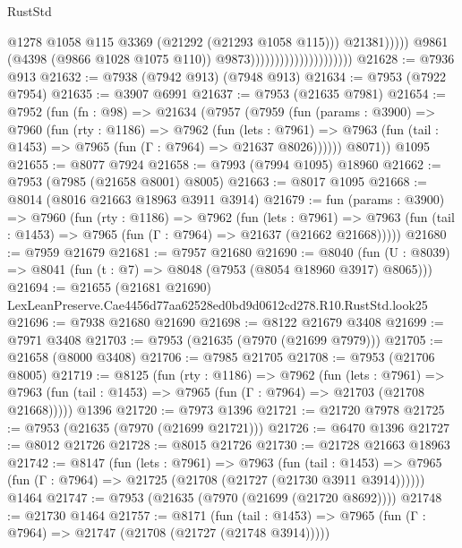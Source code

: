\begin{lexlean}{RustStd}
\begin{coremodule}
                                                          @1278
                                                          @1058
                                                          @115
                                                          @3369
                                                          (@21292 (@21293 @1058 @115)))
                                                        @21381)))))
                                              @9861
                                              (@4398 (@9866 @1028 @1075 @110))
                                              @9873)))))))))))))))))))))
@21628 := @7936 @913
@21632 := @7938 (@7942 @913) (@7948 @913)
@21634 := @7953 (@7922 @7954)
@21635 := @3907 @6991
@21637 := @7953 (@21635 @7981)
@21654 := @7952
    (fun (fn : @98) =>
    @21634
      (@7957
        (@7959
          (fun (params : @3900) =>
          @7960
            (fun (rty : @1186) =>
            @7962
              (fun (lets : @7961) =>
              @7963 (fun (tail : @1453) => @7965 (fun (Γ : @7964) => @21637 @8026))))))
        @8071))
    @1095
@21655 := @8077 @7924
@21658 := @7993 (@7994 @1095) @18960
@21662 := @7953 (@7985 (@21658 @8001) @8005)
@21663 := @8017 @1095
@21668 := @8014 (@8016 @21663 @18963 @3911 @3914)
@21679 := fun (params : @3900) =>
  @7960
    (fun (rty : @1186) =>
    @7962
      (fun (lets : @7961) =>
      @7963 (fun (tail : @1453) => @7965 (fun (Γ : @7964) => @21637 (@21662 @21668)))))
@21680 := @7959 @21679
@21681 := @7957 @21680
@21690 := @8040
    (fun (U : @8039) => @8041 (fun (t : @7) => @8048 (@7953 (@8054 @18960 @3917) @8065)))
@21694 := @21655
    (@21681 @21690)
    LexLeanPreserve.Cae4456d77aa62528ed0bd9d0612cd278.R10.RustStd.look25
@21696 := @7938 @21680 @21690
@21698 := @8122 @21679 @3408
@21699 := @7971 @3408
@21703 := @7953 (@21635 (@7970 (@21699 @7979)))
@21705 := @21658 (@8000 @3408)
@21706 := @7985 @21705
@21708 := @7953 (@21706 @8005)
@21719 := @8125
    (fun (rty : @1186) =>
    @7962
      (fun (lets : @7961) =>
      @7963 (fun (tail : @1453) => @7965 (fun (Γ : @7964) => @21703 (@21708 @21668)))))
    @1396
@21720 := @7973 @1396
@21721 := @21720 @7978
@21725 := @7953 (@21635 (@7970 (@21699 @21721)))
@21726 := @6470 @1396
@21727 := @8012 @21726
@21728 := @8015 @21726
@21730 := @21728 @21663 @18963
@21742 := @8147
    (fun (lets : @7961) =>
    @7963
      (fun (tail : @1453) =>
      @7965 (fun (Γ : @7964) => @21725 (@21708 (@21727 (@21730 @3911 @3914))))))
    @1464
@21747 := @7953 (@21635 (@7970 (@21699 (@21720 @8692))))
@21748 := @21730 @1464
@21757 := @8171
    (fun (tail : @1453) => @7965 (fun (Γ : @7964) => @21747 (@21708 (@21727 (@21748 @3914)))))

\end{coremodule}
\end{lexlean}
